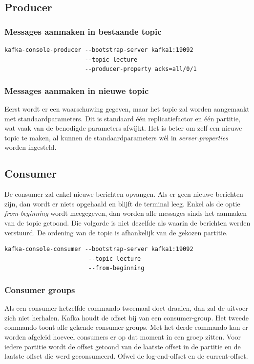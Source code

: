 \documentclass[a4paper,10pt,twoside]{report}
\begin{document}
\subsection{Producer}

\subsubsection{Messages aanmaken in bestaande topic}
\begin{lstlisting}[language=CLI-kafka]
kafka-console-producer --bootstrap-server kafka1:19092 
					   --topic lecture
					   --producer-property acks=all/0/1
\end{lstlisting}

\subsubsection{Messages aanmaken in nieuwe topic}

Eerst wordt er een waarschuwing gegeven, maar het topic zal worden aangemaakt met standaardparameters. Dit is standaard één replicatiefactor en één partitie, wat vaak van de benodigde parameters afwijkt. Het is beter om zelf een nieuwe topic te maken, al kunnen de standaardparameters wél in \textit{server.properties} worden ingesteld.

\subsection{Consumer}
De consumer zal enkel nieuwe berichten opvangen. Als er geen nieuwe berichten zijn, dan wordt er niets opgehaald en blijft de terminal leeg. Enkel als de optie \textit{from-beginning} wordt meegegeven, dan worden alle messages sinds het aanmaken van de topic getoond. Die volgorde is niet dezelfde als waarin de berichten werden verstuurd. De ordening van de topic is afhankelijk van de gekozen partitie.

\begin{lstlisting}[language=CLI-kafka]
kafka-console-consumer --bootstrap-server kafka1:19092
						--topic lecture
						--from-beginning
\end{lstlisting}

\subsubsection{Consumer groups}

Als een consumer hetzelfde commando tweemaal doet draaien, dan zal de uitvoer zich niet herhalen. Kafka houdt de offset bij van een consumer-group. Het tweede commando toont alle gekende consumer-groups. Met het derde commando kan er worden afgeleid hoeveel consumers er op dat moment in een groep zitten. Voor iedere partitie wordt de offset getoond van de laatste offset in de partitie en de laatste offset die werd geconsumeerd. Ofwel de log-end-offset en de current-offset.
\end{document}
